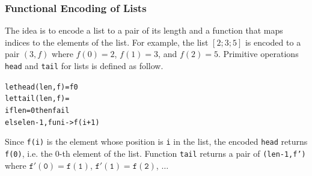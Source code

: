 %
%
%

\subsubsection{Functional Encoding of Lists}
\label{sec:list}

The idea is to encode a list to a pair of its length and a function that
maps indices to the elements of the list.  For example, the list
$[2;3;5]$ is encoded to a pair $(3,f)$ where $f(0) = 2$, $f(1) = 3$, and
$f(2) = 5$.  Primitive operations \texttt{head} and
\texttt{tail} for lists is defined as follow.
\begin{alltt}
let head (len,f) = f 0
let tail (len,f) =
 if len = 0 then fail
 else len-1, fun i -> f (i+1)
\end{alltt}
Since \texttt{f(i)} is the element whose position is \texttt{i} in the
list, the encoded \texttt{head} returns \texttt{f(0)}, i.e. the $0$-th
element of the list.  Function \texttt{tail} returns a pair of
\texttt{(len-1,f')} where $\mathtt{f'(0)} = \mathtt{f(1)}$,
$\mathtt{f'(1)} = \mathtt{f(2)}$, $\dots$

